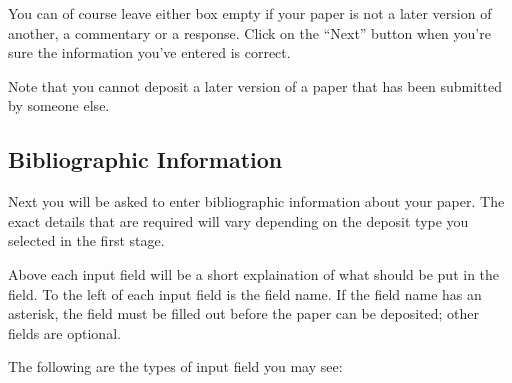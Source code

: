 You can of course leave either box empty if your paper is not a later version of another, a commentary or a response. Click on the ``Next'' button when you're sure the information you've entered is correct.

Note that you cannot deposit a later version of a paper that has been submitted by someone else.


\subsection{Bibliographic Information}

Next you will be asked to enter bibliographic information about your paper. The exact details that are required will vary depending on the deposit type you selected in the first stage.

Above each input field will be a short explaination of what should be put in the field. To the left of each input field is the field name. If the field name has an asterisk, the field must be filled out before the paper can be deposited; other fields are optional.

The following are the types of input field you may see:

